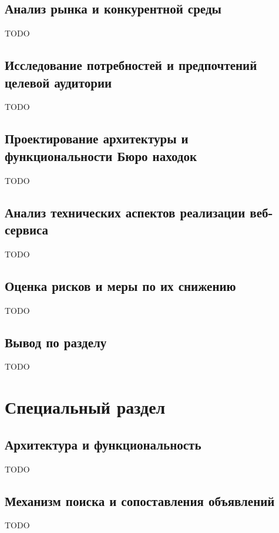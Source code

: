 \documentclass{mirea-prog-lang}
\begin{document}
\subsection{Анализ рынка и конкурентной среды}

TODO

\subsection{Исследование потребностей и предпочтений целевой аудитории}

TODO

\subsection{Проектирование архитектуры и функциональности Бюро находок}

TODO

\subsection{Анализ технических аспектов реализации веб-сервиса}

TODO

\subsection{Оценка рисков и меры по их снижению}

TODO

\subsection*{Вывод по разделу}

TODO

\section{Специальный раздел}

\subsection{Архитектура и функциональность}

TODO

\subsection{Механизм поиска и сопоставления объявлений}

TODO
\end{document}
